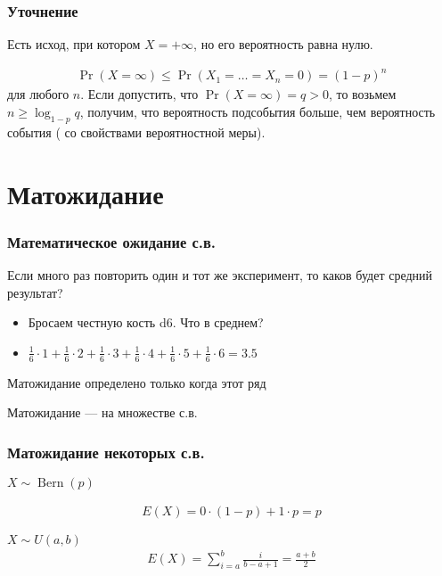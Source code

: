 \documentclass[hyperref=unicode,graphics=pdflatex,13pt,xcolor={usenames,dvipsnames}]{beamer}
\renewcommand\emph[1]{{\color{blue}{#1}}}
\DeclareMathOperator{\Bern}{Bern}
\begin{document}
\begin{frame}
  \frametitle{Уточнение}

  Есть исход, при котором $X = +\infty$, но его вероятность равна нулю.

  \begin{align*}
    \Pr(X = \infty) \le \Pr(X_1 = \dots = X_n = 0) = (1 - p)^n
  \end{align*}
  для любого $n$. Если допустить, что $\Pr(X = \infty) = q > 0$, то возьмем $n \ge \log_{1 - p} q$, получим, что вероятность подсобытия больше, чем вероятность события (\emph{Противоречие} со свойствами вероятностной меры).  
\end{frame}

\section{Матожидание}
\begin{frame}
  \frametitle{Математическое ожидание с.в.}

  Если много раз повторить один и тот же эксперимент, то каков будет средний результат?

  \begin{itemize}
    \item Бросаем честную кость d6. Что в среднем?
    \item $\frac{1}{6} \cdot 1 + \frac{1}{6} \cdot 2 + \frac{1}{6} \cdot 3 + \frac{1}{6} \cdot 4 + \frac{1}{6} \cdot 5 + \frac{1}{6} \cdot 6 = 3.5$
  \end{itemize}

  \pause

  \begin{center}
  \end{center}

  \pause
  \emph{NB:} Матожидание определено только когда этот ряд \emph{абсолютно сходится}

  \pause
  \emph{NB-2:} Матожидание --- \emph{функционал} на множестве с.в.
\end{frame}

\begin{frame}
  \frametitle{Матожидание некоторых с.в.}

  $X \sim \Bern(p)$
  
  \begin{align*}
    E(X) = 0 \cdot (1 - p) + 1 \cdot p = p
  \end{align*}

  $X \sim U(a, b)$
  \begin{align*}
    E(X) = \sum_{i = a}^b \frac{i}{b - a + 1} = \frac{a + b}{2}
  \end{align*}  
\end{frame}
\end{document}
